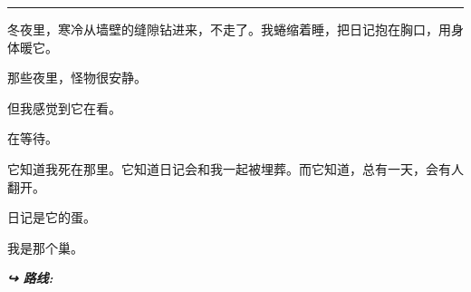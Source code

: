 \vspace{0.5em}\noindent\rule{\textwidth}{0.5pt}\vspace{0.5em}

\noindent 冬夜里，寒冷从墙壁的缝隙钻进来，不走了。我蜷缩着睡，把日记抱在胸口，用身体暖它。

\noindent 那些夜里，怪物很安静。

\noindent 但我感觉到它在看。

\noindent 在等待。

\noindent 它知道我死在那里。它知道日记会和我一起被埋葬。而它知道，总有一天，会有人翻开。

\noindent 日记是它的蛋。

\noindent 我是那个巢。

\vspace{0.5em}
\noindent\textit{\textbf{↪ 路线:}  \rotasep {}}

